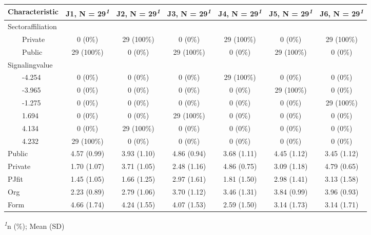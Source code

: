 \setlength{\LTpost}{0mm}
\begin{longtable}{lcccccc}
\toprule
\textbf{Characteristic} & \textbf{J1}, N = 29\textsuperscript{\textit{1}} & \textbf{J2}, N = 29\textsuperscript{\textit{1}} & \textbf{J3}, N = 29\textsuperscript{\textit{1}} & \textbf{J4}, N = 29\textsuperscript{\textit{1}} & \textbf{J5}, N = 29\textsuperscript{\textit{1}} & \textbf{J6}, N = 29\textsuperscript{\textit{1}} \\ 
\midrule\addlinespace[2.5pt]
Sectoraffiliation &  &  &  &  &  &  \\ 
    Private & 0 (0\%) & 29 (100\%) & 0 (0\%) & 29 (100\%) & 0 (0\%) & 29 (100\%) \\ 
    Public & 29 (100\%) & 0 (0\%) & 29 (100\%) & 0 (0\%) & 29 (100\%) & 0 (0\%) \\ 
Signalingvalue &  &  &  &  &  &  \\ 
    -4.254 & 0 (0\%) & 0 (0\%) & 0 (0\%) & 29 (100\%) & 0 (0\%) & 0 (0\%) \\ 
    -3.965 & 0 (0\%) & 0 (0\%) & 0 (0\%) & 0 (0\%) & 29 (100\%) & 0 (0\%) \\ 
    -1.275 & 0 (0\%) & 0 (0\%) & 0 (0\%) & 0 (0\%) & 0 (0\%) & 29 (100\%) \\ 
    1.694 & 0 (0\%) & 0 (0\%) & 29 (100\%) & 0 (0\%) & 0 (0\%) & 0 (0\%) \\ 
    4.134 & 0 (0\%) & 29 (100\%) & 0 (0\%) & 0 (0\%) & 0 (0\%) & 0 (0\%) \\ 
    4.232 & 29 (100\%) & 0 (0\%) & 0 (0\%) & 0 (0\%) & 0 (0\%) & 0 (0\%) \\ 
Public & 4.57 (0.99) & 3.93 (1.10) & 4.86 (0.94) & 3.68 (1.11) & 4.45 (1.12) & 3.45 (1.12) \\ 
Private & 1.70 (1.07) & 3.71 (1.05) & 2.48 (1.16) & 4.86 (0.75) & 3.09 (1.18) & 4.79 (0.65) \\ 
PJfit & 1.45 (1.05) & 1.66 (1.25) & 2.97 (1.61) & 1.81 (1.50) & 2.98 (1.41) & 3.13 (1.58) \\ 
Org & 2.23 (0.89) & 2.79 (1.06) & 3.70 (1.12) & 3.46 (1.31) & 3.84 (0.99) & 3.96 (0.93) \\ 
Form & 4.66 (1.74) & 4.24 (1.55) & 4.07 (1.53) & 2.59 (1.50) & 3.14 (1.73) & 3.14 (1.71) \\ 
\bottomrule
\end{longtable}
\begin{minipage}{\linewidth}
\textsuperscript{\textit{1}}n (\%); Mean (SD)\\
\end{minipage}

